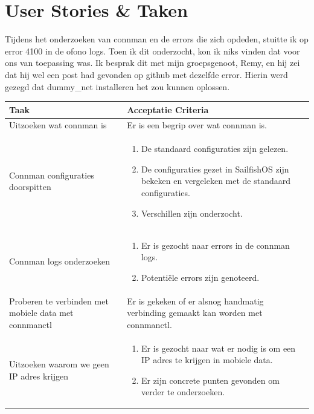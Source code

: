 \documentclass[a4paper]{report}
\newcommand{\learningstorycolor}{PaleGreen1}
\begin{document}
\section{User Stories \& Taken}
\begin{tcolorbox}[colback=white, coltitle=black, colframe=\learningstorycolor, title=\textbf{Learning Story: }Als ontwikkelaar wil ik weten wat de rol van connman is in 4G\, zodat ik kan uitzoeken of het mobiele data probleem ligt bij connman.]
  \par\smallskip 
  Tijdens het onderzoeken van connman en de errors die zich opdeden, stuitte ik op error 4100 in de ofono logs.
  Toen ik dit onderzocht, kon ik niks vinden dat voor ons van toepassing was.
  Ik besprak dit met mijn groepsgenoot, Remy, en hij zei dat hij wel een post had gevonden op github met dezelfde error.
  Hierin werd gezegd dat dummy\_net installeren het zou kunnen oplossen.

  \begin{table}[H]
      \centering
    \begin{tabularx}{1\textwidth}{|X|X|}
      \hline
      \cellcolor[HTML]{ffcc99} \textbf{Taak} & \cellcolor[HTML]{ffcc99} \textbf{Acceptatie Criteria} \\ 
      \hline
      Uitzoeken wat connman is & Er is een begrip over wat connman is. \\ 
      \hline 
      Connman configuraties doorspitten & 
      \begin{enumerate}
        \item De standaard configuraties zijn gelezen. 
        \item De configuraties gezet in SailfishOS zijn bekeken en vergeleken met de standaard configuraties.
        \item Verschillen zijn onderzocht.
      \end{enumerate} \\ 
      \hline
      Connman logs onderzoeken & 
      \begin{enumerate}
        \item Er is gezocht naar errors in de connman logs.
        \item Potentiële errors zijn genoteerd. 
      \end{enumerate}\\
      \hline
      Proberen te verbinden met mobiele data met connmanctl & 
      Er is gekeken of er alsnog handmatig verbinding gemaakt kan worden met connmanctl. \\ 
      \hline
      Uitzoeken waarom we geen IP adres krijgen & 
      \begin{enumerate}
        \item Er is gezocht naar wat er nodig is om een IP adres te krijgen in mobiele data.
        \item Er zijn concrete punten gevonden om verder te onderzoeken.
      \end{enumerate} \\


\end{tabularx}
\end{table}
\end{tcolorbox}
\end{document}
